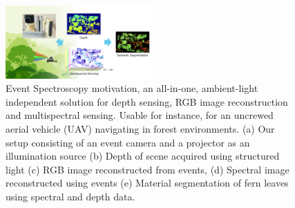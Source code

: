 
\begin{figure}[t]
    \includegraphics[width=0.5\textwidth]{resources/figures/figure_1_inspiration.pdf}
    \caption{Event Spectroscopy motivation, an all-in-one, ambient-light independent solution for depth sensing, RGB image reconstruction and multispectral sensing. Usable for instance, for an uncrewed aerial vehicle (UAV) navigating in forest environments.  (a) Our setup consisting of an event camera and a projector as an illumination source 
    (b) Depth of scene acquired using structured light (c) RGB image reconstructed from events, (d) Spectral image reconstructed using events (e) Material segmentation of fern leaves using spectral and depth data.} 
    \label{fig:eye} 
\end{figure}
